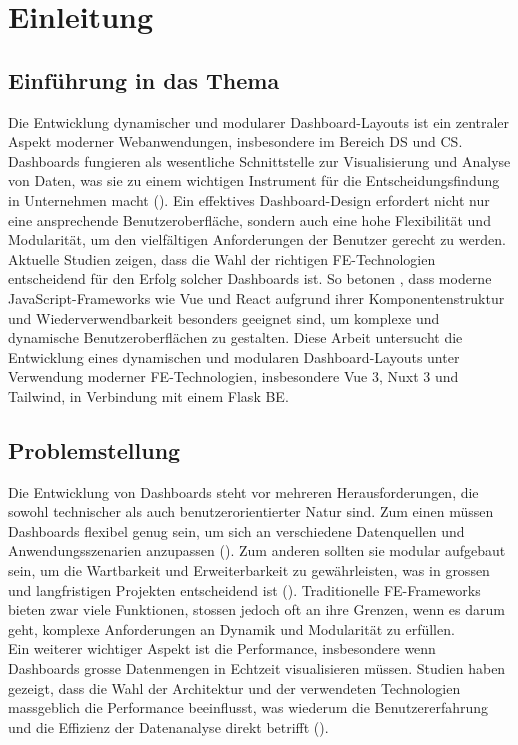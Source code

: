 \documentclass[a4paper, 12pt]{scrartcl}
\begin{document}
\newpage
{} %
\setcounter{page}{1} %


		
	\section{Einleitung}
	\label{sec:einleitung}

\subsection{Einführung in das Thema}
Die Entwicklung dynamischer und modularer Dashboard-Layouts ist ein zentraler Aspekt moderner Webanwendungen, insbesondere im Bereich \ac{DS} und \ac{CS}. Dashboards fungieren als wesentliche Schnittstelle zur Visualisierung und Analyse von Daten, was sie zu einem wichtigen Instrument für die Entscheidungsfindung in Unternehmen macht (\cite{Bach2022}). Ein effektives Dashboard-Design erfordert nicht nur eine ansprechende Benutzeroberfläche, sondern auch eine hohe Flexibilität und Modularität, um den vielfältigen Anforderungen der Benutzer gerecht zu werden.\\[1em] Aktuelle Studien zeigen, dass die Wahl der richtigen \ac{FE}-Technologien entscheidend für den Erfolg solcher Dashboards ist. So betonen \textcite{Raposo2022}, dass moderne JavaScript-Frameworks wie \ac{Vue} und React aufgrund ihrer Komponentenstruktur und Wiederverwendbarkeit besonders geeignet sind, um komplexe und dynamische Benutzeroberflächen zu gestalten. Diese Arbeit untersucht die Entwicklung eines dynamischen und modularen Dashboard-Layouts unter Verwendung moderner \ac{FE}-Technologien, insbesondere Vue 3, Nuxt 3 und \ac{Tailwind}, in Verbindung mit einem \ac{Flask} \ac{BE}.

\subsection{Problemstellung}
Die Entwicklung von Dashboards steht vor mehreren Herausforderungen, die sowohl technischer als auch benutzerorientierter Natur sind. Zum einen müssen Dashboards flexibel genug sein, um sich an verschiedene Datenquellen und Anwendungsszenarien anzupassen (\cite{Matheus2020}). Zum anderen sollten sie modular aufgebaut sein, um die Wartbarkeit und Erweiterbarkeit zu gewährleisten, was in grossen und langfristigen Projekten entscheidend ist (\cite{Behrisch2018}). Traditionelle \ac{FE}-Frameworks bieten zwar viele Funktionen, stossen jedoch oft an ihre Grenzen, wenn es darum geht, komplexe Anforderungen an Dynamik und Modularität zu erfüllen.\\[1em] Ein weiterer wichtiger Aspekt ist die Performance, insbesondere wenn Dashboards grosse Datenmengen in Echtzeit visualisieren müssen. Studien haben gezeigt, dass die Wahl der Architektur und der verwendeten Technologien massgeblich die Performance beeinflusst, was wiederum die Benutzererfahrung und die Effizienz der Datenanalyse direkt betrifft (\cite{Shneiderman2006}).
\end{document}

